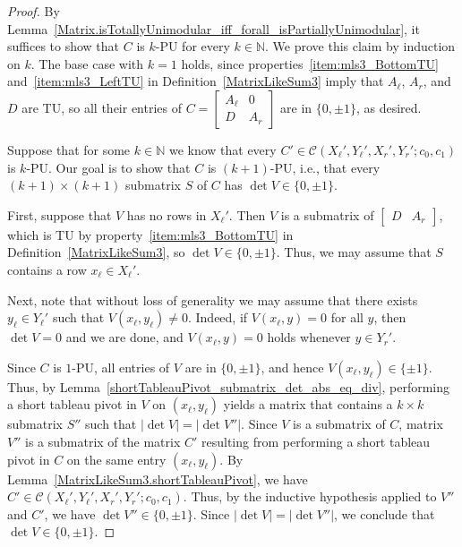 \begin{proof}
    \leanok
    By Lemma~\ref{Matrix.isTotallyUnimodular_iff_forall_isPartiallyUnimodular}, it suffices to show that $C$ is $k$-PU for every $k \in \mathbb{N}$. We prove this claim by induction on $k$. The base case with $k = 1$ holds, since properties~\ref{item:mls3_BottomTU} and~\ref{item:mls3_LeftTU} in Definition~\ref{MatrixLikeSum3} imply that $A_{\ell}$, $A_{r}$, and $D$ are TU, so all their entries of $C = \begin{bmatrix} A_{\ell} & 0 \\ D & A_{r} \end{bmatrix}$ are in $\{0, \pm 1\}$, as desired.

    Suppose that for some $k \in \mathbb{N}$ we know that every $C' \in \mathcal{C} (X_{\ell}', Y_{\ell}', X_{r}', Y_{r}'; c_{0}, c_{1})$ is $k$-PU. Our goal is to show that $C$ is $(k + 1)$-PU, i.e., that every $(k + 1) \times (k + 1)$ submatrix $S$ of $C$ has $\det V \in \{0, \pm 1\}$.

    First, suppose that $V$ has no rows in $X_{\ell}'$. Then $V$ is a submatrix of $\begin{bmatrix} D & A_{r} \end{bmatrix}$, which is TU by property~\ref{item:mls3_BottomTU} in Definition~\ref{MatrixLikeSum3}, so $\det V \in \{0, \pm 1\}$. Thus, we may assume that $S$ contains a row $x_{\ell} \in X_{\ell}'$.

    Next, note that without loss of generality we may assume that there exists $y_{\ell} \in Y_{\ell}'$ such that $V (x_{\ell}, y_{\ell}) \neq 0$. Indeed, if $V (x_{\ell}, y) = 0$ for all $y$, then $\det V = 0$ and we are done, and $V (x_{\ell}, y) = 0$ holds whenever $y \in Y_{r}'$.

    Since $C$ is $1$-PU, all entries of $V$ are in $\{0, \pm 1\}$, and hence $V (x_{\ell}, y_{\ell}) \in \{\pm 1\}$. Thus, by Lemma~\ref{shortTableauPivot_submatrix_det_abs_eq_div}, performing a short tableau pivot in $V$ on $(x_{\ell}, y_{\ell})$ yields a matrix that contains a $k \times k$ submatrix $S''$ such that $|\det V| = |\det V''|$. Since $V$ is a submatrix of $C$, matrix $V''$ is a submatrix of the matrix $C'$ resulting from performing a short tableau pivot in $C$ on the same entry $(x_{\ell}, y_{\ell})$. By Lemma~\ref{MatrixLikeSum3.shortTableauPivot}, we have $C' \in \mathcal{C} (X_{\ell}', Y_{\ell}', X_{r}', Y_{r}'; c_{0}, c_{1})$. Thus, by the inductive hypothesis applied to $V''$ and $C'$, we have $\det V'' \in \{0, \pm 1\}$. Since $|\det V| = |\det V''|$, we conclude that $\det V \in \{0, \pm 1\}$.
\end{proof}

